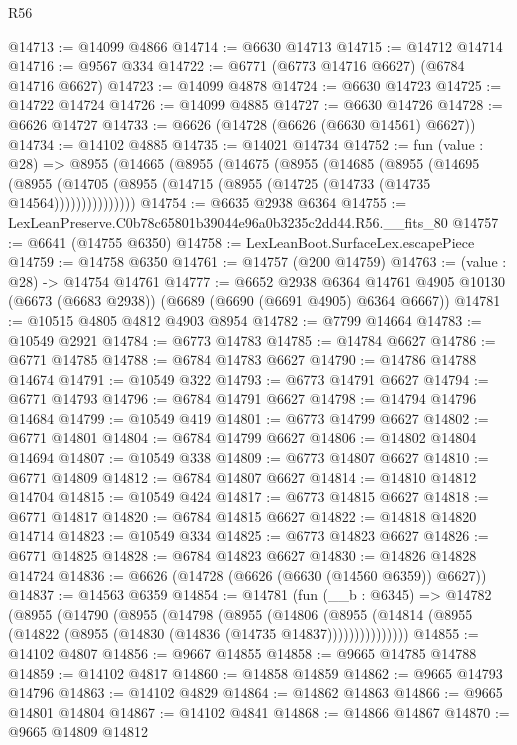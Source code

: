 \begin{lexlean}{R56}
\begin{coremodule}
@14713 := @14099 @4866
@14714 := @6630 @14713
@14715 := @14712 @14714
@14716 := @9567 @334
@14722 := @6771 (@6773 @14716 @6627) (@6784 @14716 @6627)
@14723 := @14099 @4878
@14724 := @6630 @14723
@14725 := @14722 @14724
@14726 := @14099 @4885
@14727 := @6630 @14726
@14728 := @6626 @14727
@14733 := @6626 (@14728 (@6626 (@6630 @14561) @6627))
@14734 := @14102 @4885
@14735 := @14021 @14734
@14752 := fun (value : @28) =>
  @8955
    (@14665
      (@8955
        (@14675
          (@8955
            (@14685
              (@8955
                (@14695
                  (@8955 (@14705 (@8955 (@14715 (@8955 (@14725 (@14733 (@14735 @14564)))))))))))))))
@14754 := @6635 @2938 @6364
@14755 := LexLeanPreserve.C0b78c65801b39044e96a0b3235c2dd44.R56.__fits_80
@14757 := @6641 (@14755 @6350)
@14758 := LexLeanBoot.SurfaceLex.escapePiece
@14759 := @14758 @6350
@14761 := @14757 (@200 @14759)
@14763 := (value : @28) -> @14754 @14761
@14777 := @6652
    @2938
    @6364
    @14761
    @4905
    @10130
    (@6673 (@6683 @2938))
    (@6689 (@6690 (@6691 @4905) @6364 @6667))
@14781 := @10515 @4805 @4812 @4903 @8954
@14782 := @7799 @14664
@14783 := @10549 @2921
@14784 := @6773 @14783
@14785 := @14784 @6627
@14786 := @6771 @14785
@14788 := @6784 @14783 @6627
@14790 := @14786 @14788 @14674
@14791 := @10549 @322
@14793 := @6773 @14791 @6627
@14794 := @6771 @14793
@14796 := @6784 @14791 @6627
@14798 := @14794 @14796 @14684
@14799 := @10549 @419
@14801 := @6773 @14799 @6627
@14802 := @6771 @14801
@14804 := @6784 @14799 @6627
@14806 := @14802 @14804 @14694
@14807 := @10549 @338
@14809 := @6773 @14807 @6627
@14810 := @6771 @14809
@14812 := @6784 @14807 @6627
@14814 := @14810 @14812 @14704
@14815 := @10549 @424
@14817 := @6773 @14815 @6627
@14818 := @6771 @14817
@14820 := @6784 @14815 @6627
@14822 := @14818 @14820 @14714
@14823 := @10549 @334
@14825 := @6773 @14823 @6627
@14826 := @6771 @14825
@14828 := @6784 @14823 @6627
@14830 := @14826 @14828 @14724
@14836 := @6626 (@14728 (@6626 (@6630 (@14560 @6359)) @6627))
@14837 := @14563 @6359
@14854 := @14781
    (fun (__b : @6345) =>
    @14782
      (@8955
        (@14790
          (@8955
            (@14798
              (@8955
                (@14806
                  (@8955 (@14814 (@8955 (@14822 (@8955 (@14830 (@14836 (@14735 @14837)))))))))))))))
@14855 := @14102 @4807
@14856 := @9667 @14855
@14858 := @9665 @14785 @14788
@14859 := @14102 @4817
@14860 := @14858 @14859
@14862 := @9665 @14793 @14796
@14863 := @14102 @4829
@14864 := @14862 @14863
@14866 := @9665 @14801 @14804
@14867 := @14102 @4841
@14868 := @14866 @14867
@14870 := @9665 @14809 @14812

\end{coremodule}
\end{lexlean}
